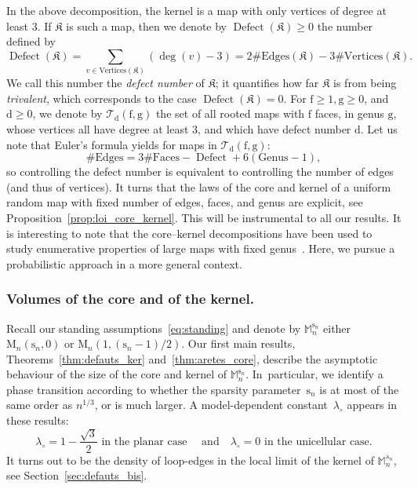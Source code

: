 \documentclass[JEP,XML,SOM,Unicode,NoFloatCountersInSection,NoEqCountersInSection]{cedram}
\theoremstyle{plain}
\theoremstyle{definition}
\theoremstyle{remark}
\newcommand{\Map}{\mathrm{M}}
\newcommand{\Mapb}{\mathbb{M}}
\newcommand{\face}{\mathrm{f}}
\newcommand{\defect}{\mathrm{d}}
\newcommand{\gen}{\mathrm{g}}
\newcommand{\spar}{\mathrm{s}}
\DeclareMathOperator{\Defect}{Defect}
\begin{document}
In the above decomposition, the kernel is a map with only vertices of degree at least $3$. If $\mathfrak{K}$ is such a map, then we denote by $\Defect(\mathfrak{K}) \ge 0$ the number defined by
\[
\Defect(\mathfrak{K}) = \sum_{v \in \mathrm{Vertices}(\mathfrak{K})} (\deg(v)-3)
= 2\#\mathrm{Edges}(\mathfrak{K}) - 3\#\mathrm{Vertices}(\mathfrak{K}).
\]
We call this number the \emph{defect number} of $\mathfrak{K}$; it quantifies how far $\mathfrak{K}$ is from being \emph{trivalent}, which corresponds to the case $\Defect(\mathfrak{K}) = 0$.
For $\face \geq 1, \gen \geq 0$, and $\defect \geq 0$, we denote by $\mathcal{T}_{\defect}(\face, \gen)$ the set of all rooted maps with $ \face$ faces, in genus $ \gen$, whose vertices all have degree at least $3$, and which have defect number $\defect$. Let us note that Euler's formula yields for maps in $\mathcal{T}_{\defect}(\face, \gen)$:
\begin{equation}\label{eq:Euler_defauts}
\#\mathrm{Edges} = 3\#\mathrm{Faces} - \Defect + 6(\mathrm{Genus}-1),
\end{equation}
so controlling the defect number is equivalent to controlling the number of edges (and thus of vertices). It turns that the laws of the core and kernel of a uniform random map with fixed number of edges, faces, and genus are explicit, see Proposition~\ref{prop:loi_core_kernel}. This will be instrumental to all our results. It is interesting to note that the core--kernel decompositions have been used to study enumerative properties of large maps with fixed genus~\cite{CMS09,Cha10}. Here, we pursue a probabilistic approach in a more general context.

\subsubsection*{Volumes of the core and of the kernel.}
Recall our standing assumptions~\eqref{eq:standing} and denote by $ \Mapb_{n}^{\spar_{n}}$ either $ \Map_{n}(\spar_{n},0)$ or $ \Map_{n}(1,(\spar_{n}-1)/2)$. Our first main results, Theorems~\ref{thm:defauts_ker} and~\ref{thm:aretes_core}, describe the asymptotic behaviour of the size of the core and kernel of $ \Mapb_{n}^{\spar_{n}}$. In~particular, we identify a phase transition according to whether the sparsity parameter~$\spar_{n}$ is at most of the same order as $n^{1/3}$, or is much larger.
A model-dependent constant~$\lambda_\circ$ appears in these results:
\begin{equation}\label{eq:lambda}
\lambda_\circ = 1-\frac{\sqrt{3}}{2}\text{ in the planar case }
\quad\text{and}\quad
\lambda_\circ = 0\text{ in the unicellular case}.
\end{equation}
It turns out to be the density of loop-edges in the local limit of the kernel of $ \Mapb_n^{s_n}$, see Section~\ref{sec:defauts_bis}.
\end{document}

